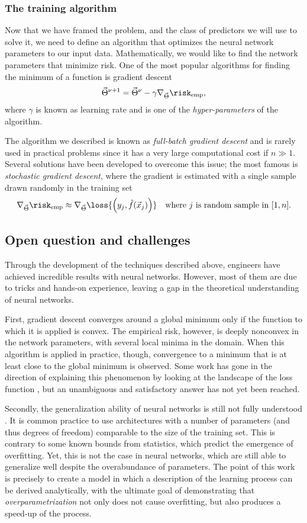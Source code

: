\subsubsection{The training algorithm}
Now that we have framed the problem, and the class of predictors we will use to solve it,
we need to define an algorithm that optimizes the neural network parameters to our input data.
Mathematically, we would like to find the network parameters that minimize risk.
One of the most popular algorithms for finding the minimum of a function is gradient descent
\[
  \vec{\Theta}^{\nu+1} = \vec{\Theta}^{\nu} - \gamma \nabla_{\vec{\Theta}} \risk_\text{emp},
\]
where \(\gamma\) is known as learning rate and is one of the \emph{hyper-parameters} of the algorithm.

The algorithm we described is known as \emph{full-batch gradient descent} and is rarely used in practical problems since it has a very large computational cost if \(n\gg1\).
Several solutions have been developed to overcome this issue; the most famous is \emph{stochastic gradient descent},
where the gradient is estimated with a single sample drawn randomly in the training set
\[
  \nabla_{\vec{\Theta}} \risk_\text{emp} \approx \nabla_{\vec{\Theta}}\loss{\left(y_j,\hat{f}{(\vec{x}_j)}\right)}\quad
  \text{where $j$ is random sample in }[1,n].
\]

\subsection{Open question and challenges}
Through the development of the techniques described above, engineers have achieved incredible results with neural networks. However, most of them are due to tricks and hands-on experience, leaving a gap in the theoretical understanding of neural networks.

First, gradient descent converges around a global minimum only if the function to which it is applied is convex.
The empirical risk, however, is deeply nonconvex in the network parameters, with several local minima in the domain.
When this algorithm is applied in practice, though, convergence to a minimum that is at least close to the global minimum is observed.
Some work has gone in the direction of explaining this phenomenon by looking at the landscape of the loss function \cite{sarao2020optimization,sarao2020complex}, but an unambiguous and satisfactory answer has not yet been reached.

Secondly, the generalization ability of neural networks is still not fully understood \cite{zhang2021understanding}.
It is common practice to use architectures with a number of parameters (and thus degrees of freedom) comparable to the size of the training set. This is contrary to some known bounds from statistics, which predict the emergence of overfitting. Yet, this is not the case in neural networks, which are still able to generalize well despite the overabundance of parameters.
The point of this work is precisely to create a model in which a description of the learning process can be derived analytically, with the ultimate goal of demonstrating that \emph{overparametrization} not only does not cause overfitting, but also produces a speed-up of the process.

